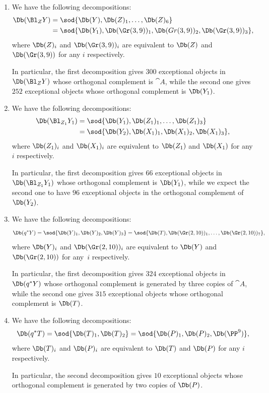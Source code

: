 \skpt
\begin{prop}\label{prop:decos-in-the-diagram}
\begin{enumerate}\renewcommand{\theenumi}{\Alph{enumi}}
\item\label{enum:A}
We have the following decompositions:
\begin{align*}
\Db(\Bl_Z Y) &= \sod{\Db(Y), \Db(Z)_1,\ldots,\Db(Z)_6}\\
&= \sod{\Db(Y_1),\Db(\Gr(3,9))_1,\Db(Gr(3,9))_2,\Db(\Gr(3,9))_3},
\end{align*}
where $\Db(Z)_i$ and $\Db(\Gr(3,9))_i$ are equivalent to $\Db(Z)$ and
$\Db(\Gr(3,9))$ for any $i$ respectively.

In particular, the first decomposition gives $300$ exceptional objects in $\Db(\Bl_Z Y)$
whose orthogonal complement is $\cat{A}$, while the second one gives $252$ exceptional objects
whose orthogonal complement is $\Db(Y_1)$.

\item\label{enum:B}
We have the following decompositions:
\begin{align*}
\Db(\Bl_{Z_1} Y_1) &= \sod{\Db(Y_1), \Db(Z_1)_1,\ldots,\Db(Z_1)_3}\\
&= \sod{\Db(Y_2),\Db(X_1)_1,\Db(X_1)_2,\Db(X_1)_3},
\end{align*}
where $\Db(Z_1)_i$ and $\Db(X_1)_i$ are equivalent to $\Db(Z_1)$ and
$\Db(X_1)$ for any $i$ respectively.

In particular, the first decomposition gives $66$
exceptional objects in $\Db(\Bl_{Z_1} Y_1)$
whose orthogonal complement is $\Db(Y_1)$, while we expect the second one
to have $96$ exceptional objects in the orthogonal complement of $\Db(Y_2)$.

\item\label{enum:C}
We have the following decompositions:
\[
\Db(q^* Y) = \sod{\Db(Y)_1, \Db(Y)_2,\Db(Y)_3}= \sod{\Db(T),\Db(\Gr(2,10))_1,\ldots,\Db(\Gr(2,10))_7},
\]
where $\Db(Y)_i$ and $\Db(\Gr(2,10))_i$ are equivalent to $\Db(Y)$ and
$\Db(\Gr(2,10))$ for any~$i$ respectively.

In particular, the first decomposition gives $324$ exceptional objects in $\Db(q^* Y)$
whose orthogonal complement is generated by three copies of $\cat{A}$, while the second one gives
$315$ exceptional objects whose orthogonal complement is $\Db(T)$.

\item\label{enum:D}
We have the following decompositions:
\[
\Db(q^* T) = \sod{\Db(T)_1, \Db(T)_2}= \sod{\Db(P)_1,\Db(P)_2,\Db(\PP^9)},
\]
where $\Db(T)_i$ and $\Db(P)_i$ are equivalent to $\Db(T)$ and
$\Db(P)$ for any $i$ respectively.

In particular, the second decomposition gives $10$ exceptional objects
whose orthogonal complement is generated by two copies of $\Db(P)$.
\end{enumerate}
\end{prop}

